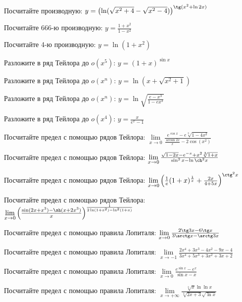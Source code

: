 \documentclass[russian]{article}
\begin{document}
 Посчитайте производную:
 $y = \left( \ln(\sqrt{x^2 + 4} - \sqrt{x^2 - 4}) \right)^{\tg(x^2 + \ln 2x)}$
 
 Посчитайте 666-ю производную:
 $y = \frac{1 + x^2}{1 - x^2}$
 
 Посчитайте 4-ю производную:
 $y = \ln(1 + x^2)$
 
 
 Разложите в ряд Тейлора до $o(x^5)$:
 $y = (1 + x)^{\sin x}$
 
 Разложите в ряд Тейлора до $o(x^n)$:
 $y = \ln(x + \sqrt{x^2 + 1})$
 
 Разложите в ряд Тейлора до $o(x^n)$:
 $y = \ln\sqrt{\frac{e - x^3}{1 - ex^3}}$
 
 Разложите в ряд Тейлора до $o(x^4)$:
 $y = \frac{x}{e^x - 1}$
 
 
 Посчитайте предел с помощью рядов Тейлора:
 $\lim\limits_{x \to 0} \frac{e^{\cos x} - e\sqrt[3]{1 - 4x^2}}{\frac{\arcsin 2x}{x} - 2\cos (x^2)}$
 
 Посчитайте предел с помощью рядов Тейлора:
 $\lim\limits_{x \to 0} \frac{\sqrt{1 - 2x} - e^{-x} + x^2\sqrt[3]{1 + x}}{\sin^2 x - \ln \ch^2 x}$
 
 Посчитайте предел с помощью рядов Тейлора:
 $\lim\limits_{x \to 0} \left( \frac{1}{e} (1 + x)^\frac{1}{x} + \frac{2x}{4 + 5x} \right)^{\ctg^2 x}$
 
 Посчитайте предел с помощью рядов Тейлора:
 $\lim\limits_{x \to 0} \left( \frac{\sin (2x + x^3) - \sh(x + 2x^3)}{x} \right)^\frac{1}{2\ln(1 + x^2) - \ln^2(1 + x)}$
 
 
 
 
 Посчитайте предел с помощью правила Лопиталя:
 $\lim\limits_{x \to 0} \frac{2\tg 3x - 6 \tg x}{3 \arctg x - \arctg 3x}$
 
 Посчитайте предел с помощью правила Лопиталя:
 $\lim\limits_{x \to -1} \frac{2x^4 + 3x^3 - 4x^2 - 9x - 4}{3x^4 + 5x^3 +3x^2 + 3x + 2}$
 
 Посчитайте предел с помощью правила Лопиталя:
 $\lim\limits_{x \to 0} \frac{e^{\sin x} - e^x}{\sin x - x}$
 
 Посчитайте предел с помощью правила Лопиталя:
 $\lim\limits_{x \to +\infty} \frac{\sqrt[3]{x} \ln\ln x}{\sqrt[3]{2x + 3}\sqrt{\ln x}}$ 

 
\end{document}
